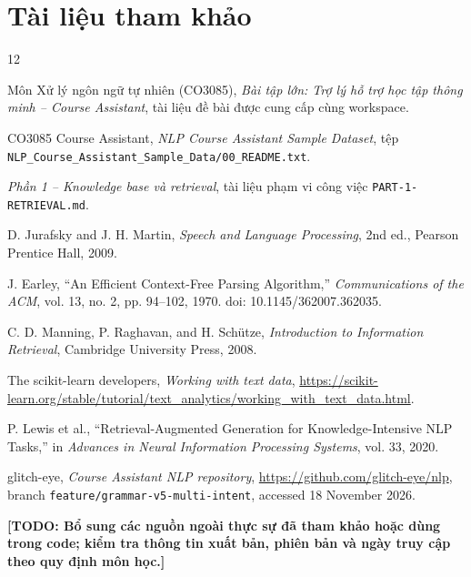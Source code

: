 \chapter{Tài liệu tham khảo}

\begin{thebibliography}{12}

Môn Xử lý ngôn ngữ tự nhiên (CO3085),
\emph{Bài tập lớn: Trợ lý hỗ trợ học tập thông minh -- Course Assistant},
tài liệu đề bài được cung cấp cùng workspace.

CO3085 Course Assistant,
\emph{NLP Course Assistant Sample Dataset},
tệp \texttt{NLP\_Course\_Assistant\_Sample\_Data/00\_README.txt}.

\emph{Phần 1 -- Knowledge base và retrieval},
tài liệu phạm vi công việc \texttt{PART-1-RETRIEVAL.md}.

D. Jurafsky and J. H. Martin,
\emph{Speech and Language Processing}, 2nd ed.,
Pearson Prentice Hall, 2009.

J. Earley,
``An Efficient Context-Free Parsing Algorithm,''
\emph{Communications of the ACM}, vol. 13, no. 2, pp. 94--102, 1970.
doi: 10.1145/362007.362035.

C. D. Manning, P. Raghavan, and H. Sch\"utze,
\emph{Introduction to Information Retrieval},
Cambridge University Press, 2008.

The scikit-learn developers,
\emph{Working with text data},
\url{https://scikit-learn.org/stable/tutorial/text\_analytics/working\_with\_text\_data.html}.

P. Lewis et al.,
``Retrieval-Augmented Generation for Knowledge-Intensive NLP Tasks,''
in \emph{Advances in Neural Information Processing Systems}, vol. 33, 2020.

glitch-eye, \emph{Course Assistant NLP repository},
\url{https://github.com/glitch-eye/nlp}, branch \texttt{feature/grammar-v5-multi-intent}, accessed 18 November 2026.

\end{thebibliography}

\textbf{[TODO: Bổ sung các nguồn ngoài thực sự đã tham khảo hoặc dùng trong code; kiểm tra thông tin xuất bản, phiên bản và ngày truy cập theo quy định môn học.]}
